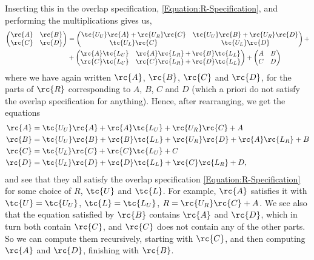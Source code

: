 Inserting this in the overlap specification, \eqref{Equation:R-Specification}, and performing the multiplications gives us,
\begin{align*}
  \begin{pmatrix}
    \rc{A} & \rc{B} \\
    \rc{C} & \rc{D}
  \end{pmatrix} &= 
  \begin{pmatrix}
    \tc{U_U}\rc{A} + \rc{U_R}\rc{C}  &  \tc{U_U}\rc{B} + \rc{U_R}\rc{D} \\
    \tc{U_L}\rc{C}                   &  \tc{U_L}\rc{D}
  \end{pmatrix}
  +\\&+
  \begin{pmatrix}
    \rc{A}\tc{L_U}        &   \rc{A}\rc{L_R} + \rc{B}\tc{L_L}\\
    \rc{C}\tc{L_U}        &   \rc{C}\rc{L_R} + \rc{D}\tc{L_L}
  \end{pmatrix}
  +
  \begin{pmatrix}
    A & B \\
    C & D
  \end{pmatrix}
\end{align*}
where we have again written $\rc{A}$, $\rc{B}$, $\rc{C}$ and $\rc{D}$, for the parts of $\rc{R}$ corresponding to $A$, $B$, $C$ and $D$ (which a priori do not satisfy the overlap specification for anything).
Hence, after rearranging, we get the equations
\begin{align*}
  \rc{A} &= \tc{U_U}\rc{A} + \rc{A}\tc{L_U} + \rc{U_R}\rc{C} + A \\
  \rc{B} &= \tc{U_U}\rc{B} + \rc{B}\tc{L_L} + \rc{U_R}\rc{D} + \rc{A}\rc{L_R} + B \\
  \rc{C} &= \tc{U_L}\rc{C} + \rc{C}\tc{L_U} + C\\
  \rc{D} &= \tc{U_L}\rc{D} + \rc{D}\tc{L_L} + \rc{C}\rc{L_R} +  D,
\end{align*}
and see that they all satisfy the overlap specification \eqref{Equation:R-Specification} for some choice of $R$, $\tc{U}$ and $\tc{L}$. For example, $\rc{A}$ satisfies it with $\tc{U} = \tc{U_U}$, $\tc{L} = \tc{L_U}$, $R = \rc{U_R}\rc{C} + A$. We see also that the equation satisfied by $\rc{B}$ contains $\rc{A}$ and $\rc{D}$, which in turn both contain $\rc{C}$, and $\rc{C}$ does not contain any of the other parts. So we can compute them recursively, starting with $\rc{C}$, and then computing $\rc{A}$ and $\rc{D}$, finishing with $\rc{B}$.
